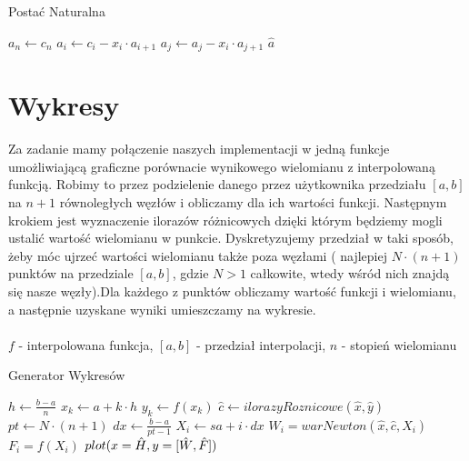 \documentclass[10pt]{article}
\begin{document}
\begin{algorithm}[H]
\caption{Postać Naturalna}\label{alg:cap}
\begin{algorithmic}
    \State $a_n \gets c_n$
        \State $a_i \gets c_i - x_i \cdot a_{i+1}$
            \State $a_j \gets a_j - x_i \cdot a_{j+1}$
        \EndFor
    \EndFor
    \State \Return $\hat{a}$
    \EndFunction
\end{algorithmic}
\end{algorithm}

\section{Wykresy}
Za zadanie mamy połączenie naszych implementacji w jedną funkcje umożliwiającą graficzne porównacie wynikowego wielomianu z interpolowaną funkcją. Robimy to przez podzielenie danego przez użytkownika przedziału $[a,b]$ na $n+1$ równoległych węzłów i obliczamy dla ich wartości funkcji. Następnym krokiem jest wyznaczenie ilorazów różnicowych dzięki którym będziemy mogli ustalić wartość wielomianu w punkcie. Dyskretyzujemy przedział w taki sposób, żeby móc
ujrzeć wartości wielomianu także poza węzłami ( najlepiej $N\cdot (n+1)$ punktów na przedziale $[a,b]$, gdzie $N>1$ całkowite, wtedy wśród nich znajdą się nasze węzły).Dla każdego z punktów obliczamy wartość funkcji i wielomianu, a następnie uzyskane wyniki umieszczamy na wykresie.\\\\
$f$ - interpolowana funkcja, $[a, b]$ - przedział interpolacji, $n$ - stopień wielomianu

\begin{algorithm}[H]
\caption{Generator Wykresów}\label{alg:cap}
\begin{algorithmic}
    \State $h \gets \frac{b-a}{n}$
        \State $x_k \gets a + k\cdot h$
        \State $y_k \gets f(x_k)$
    \EndFor
    \State $\hat{c} \gets ilorazyRoznicowe(\hat{x}, \hat{y})$
    \State $pt \gets N \cdot (n+1)$
    \State $dx \gets \frac{b-a}{pt - 1}$
        \State $X_i \gets sa + i \cdot dx$
        \State $W_i = warNewton(\hat{x}, \hat{c}, X_i)$
        \State $F_i = f(X_i)$
    \EndFor
    \State $plot(x=\Hat{H}, y=[\Hat{W}, \Hat{F}] )$
    \EndFunction
\end{algorithmic}
\end{algorithm}
\end{document}
